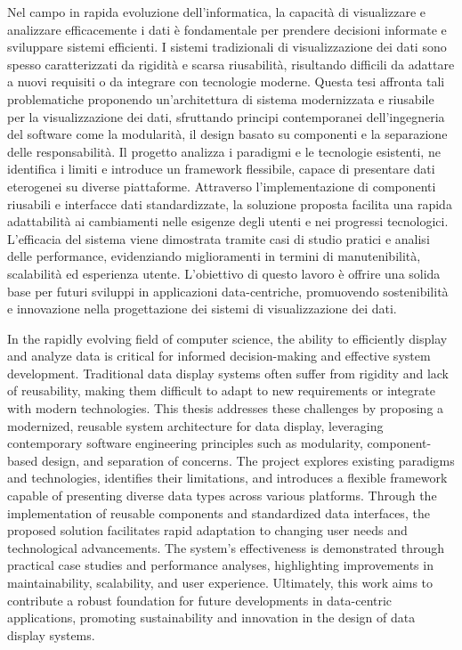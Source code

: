
\cleardoublepage
\null
\begin{center}
\bfseries
\abstractname
\end{center}
Nel campo in rapida evoluzione dell'informatica, la capacità di visualizzare e analizzare efficacemente i dati è fondamentale per prendere decisioni informate e sviluppare sistemi efficienti. I sistemi tradizionali di visualizzazione dei dati sono spesso caratterizzati da rigidità e scarsa riusabilità, risultando difficili da adattare a nuovi requisiti o da integrare con tecnologie moderne. Questa tesi affronta tali problematiche proponendo un'architettura di sistema modernizzata e riusabile per la visualizzazione dei dati, sfruttando principi contemporanei dell'ingegneria del software come la modularità, il design basato su componenti e la separazione delle responsabilità. Il progetto analizza i paradigmi e le tecnologie esistenti, ne identifica i limiti e introduce un framework flessibile, capace di presentare dati eterogenei su diverse piattaforme. Attraverso l'implementazione di componenti riusabili e interfacce dati standardizzate, la soluzione proposta facilita una rapida adattabilità ai cambiamenti nelle esigenze degli utenti e nei progressi tecnologici. L'efficacia del sistema viene dimostrata tramite casi di studio pratici e analisi delle performance, evidenziando miglioramenti in termini di manutenibilità, scalabilità ed esperienza utente. L'obiettivo di questo lavoro è offrire una solida base per futuri sviluppi in applicazioni data-centriche, promuovendo sostenibilità e innovazione nella progettazione dei sistemi di visualizzazione dei dati.
\vfill

\cleardoublepage
\null
\begin{center}
\bfseries
\abstractname
\end{center}
In the rapidly evolving field of computer science, the ability to efficiently display and analyze data is critical for informed decision-making and effective system development. Traditional data display systems often suffer from rigidity and lack of reusability, making them difficult to adapt to new requirements or integrate with modern technologies. This thesis addresses these challenges by proposing a modernized, reusable system architecture for data display, leveraging contemporary software engineering principles such as modularity, component-based design, and separation of concerns. The project explores existing paradigms and technologies, identifies their limitations, and introduces a flexible framework capable of presenting diverse data types across various platforms. Through the implementation of reusable components and standardized data interfaces, the proposed solution facilitates rapid adaptation to changing user needs and technological advancements. The system’s effectiveness is demonstrated through practical case studies and performance analyses, highlighting improvements in maintainability, scalability, and user experience. Ultimately, this work aims to contribute a robust foundation for future developments in data-centric applications, promoting sustainability and innovation in the design of data display systems.
\vfill
